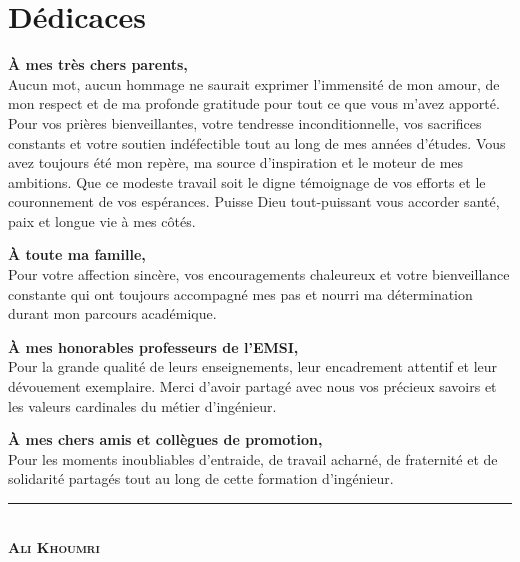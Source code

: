 \documentclass[12pt,a4paper]{report}
\begin{document}
\chapter*{Dédicaces}
\thispagestyle{plain}

\vspace*{0.8cm}

\begin{center}
\begin{minipage}{0.88\textwidth}

\noindent
\textbf{\large À mes très chers parents,}\\[6pt]
\normalsize
Aucun mot, aucun hommage ne saurait exprimer l'immensité de mon amour, de mon respect et de ma profonde gratitude pour tout ce que vous m'avez apporté. Pour vos prières bienveillantes, votre tendresse inconditionnelle, vos sacrifices constants et votre soutien indéfectible tout au long de mes années d'études. Vous avez toujours été mon repère, ma source d'inspiration et le moteur de mes ambitions. Que ce modeste travail soit le digne témoignage de vos efforts et le couronnement de vos espérances. Puisse Dieu tout-puissant vous accorder santé, paix et longue vie à mes côtés.

\vspace{0.8cm}

\noindent
\textbf{\large À toute ma famille,}\\[6pt]
\normalsize
Pour votre affection sincère, vos encouragements chaleureux et votre bienveillance constante qui ont toujours accompagné mes pas et nourri ma détermination durant mon parcours académique.

\vspace{0.8cm}

\noindent
\textbf{\large À mes honorables professeurs de l'EMSI,}\\[6pt]
\normalsize
Pour la grande qualité de leurs enseignements, leur encadrement attentif et leur dévouement exemplaire. Merci d'avoir partagé avec nous vos précieux savoirs et les valeurs cardinales du métier d'ingénieur.

\vspace{0.8cm}

\noindent
\textbf{\large À mes chers amis et collègues de promotion,}\\[6pt]
\normalsize
Pour les moments inoubliables d'entraide, de travail acharné, de fraternité et de solidarité partagés tout au long de cette formation d'ingénieur.

\vspace{1.2cm}

\begin{flushright}
  \rule{5cm}{0.6pt}\\[0.25cm]
  {\large\textbf{\textsc{Ali Khoumri}}}
\end{flushright}

\end{minipage}
\end{center}
\end{document}
